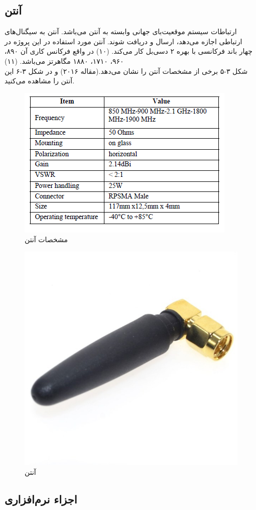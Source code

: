 \subsection{آنتن }
ارتباطات سیستم موقعیت‌بای جهانی وابسته به آنتن می‌باشد. آنتن به سیگنال‌های ارتباطی اجازه می‌دهد، ارسال و دریافت شوند. آنتن مورد استفاده در این پروژه در چهار باند فرکانسی با بهره ۲ دسی‌بل کار می‌کند. (۱۰) در واقع فرکانس کاری آن ۸۹۰، ۹۶۰، ۱۷۱۰، ۱۸۸۰ مگاهرتز می‌باشد. (۱۱)
\\
شکل ۳-۵ برخی از مشخصات آنتن را نشان می‌دهد.(مقاله ۲۰۱۶) و در شکل ۳-۶ این آنتن را مشاهده می‌کنید.
\begin{figure}[!h]
	\centerline{\includegraphics[width=.6\textwidth]{table1}}
	\caption{مشخصات آنتن }
\end{figure}
\begin{figure}[!h]
	\centerline{\includegraphics[width=.3\textwidth]{GSM-antenna}}
	\caption{آنتن }
\end{figure}

\subsection{اجزاء نرم‌افزاری}

